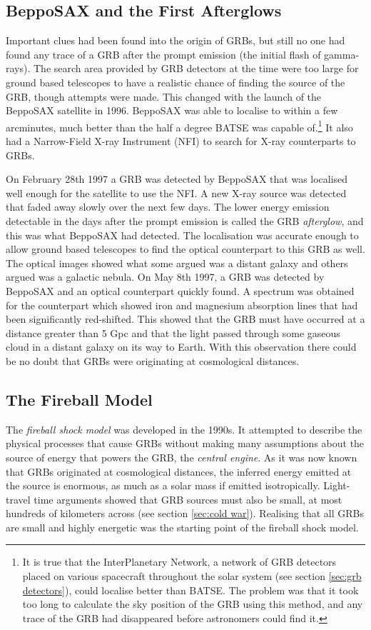 \documentclass[11pt]{cuthesis}
\begin{document}
\subsection{BeppoSAX and the First Afterglows}
Important clues had been found into the origin of GRBs, but still no one had found any trace of a GRB after the prompt emission (the initial flash of gamma-rays). The search area provided by GRB detectors at the time were too large for ground based telescopes to have a realistic chance of finding the source of the GRB, though attempts were made. This changed with the launch of the BeppoSAX satellite in 1996. BeppoSAX was able to localise to within a few arcminutes, much better than the half a degree BATSE was capable of.\footnote{It is true that the InterPlanetary Network, a network of GRB detectors placed on various spacecraft throughout the solar system (see section \ref{sec:grb detectors}), could localise better than BATSE. The problem was that it took too long to calculate the sky position of the GRB using this method, and any trace of the GRB had disappeared before astronomers could find it.} It also had a Narrow-Field X-ray Instrument (NFI) to search for X-ray counterparts to GRBs.

On February 28th 1997 a GRB was detected by BeppoSAX that was localised well enough for the satellite to use the NFI. A new X-ray source was detected that faded away slowly over the next few days. The lower energy emission detectable in the days after the prompt emission is called the GRB \textit{afterglow}, and this was what BeppoSAX had detected. The localisation was accurate enough to allow ground based telescopes to find the optical counterpart to this GRB as well. The optical images showed what some argued was a distant galaxy and others argued was a galactic nebula. On May 8th 1997, a GRB was detected by BeppoSAX and an optical counterpart quickly found. A spectrum was obtained for the counterpart which showed iron and magnesium absorption lines that had been significantly red-shifted. This showed that the GRB must have occurred at a distance greater than 5 Gpc and that the light passed through some gaseous cloud in a distant galaxy on its way to Earth. With this observation there could be no doubt that GRBs were originating at cosmological distances.  

\subsection{The Fireball Model} \label{sec: fireball}
The \textit{fireball shock model} was developed in the 1990s. It attempted to describe the physical processes that cause GRBs without making many assumptions about the source of energy that powers the GRB, the \textit{central engine}. As it was now known that GRBs originated at cosmological distances, the inferred energy emitted at the source is enormous, as much as a solar mass if emitted isotropically. Light-travel time arguments showed that GRB sources must also be small, at most hundreds of kilometers across (see section \ref{sec:cold war}). Realising that all GRBs are small and highly energetic was the starting point of the fireball shock model.
\end{document}
